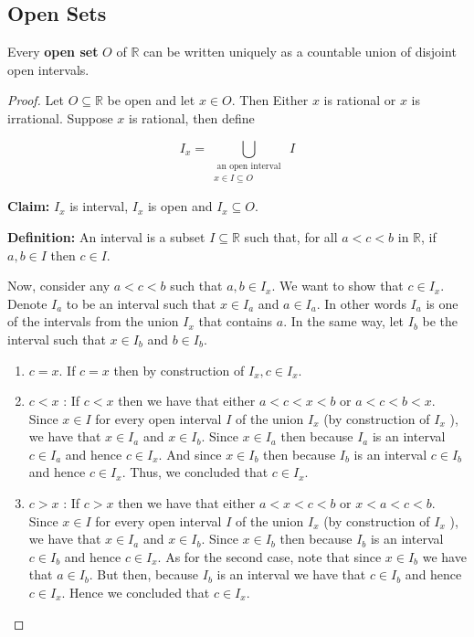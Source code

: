 \documentclass[UTF8,12pt,AutoFakeBold]{ctexbook}
\numberwithin{equation}{section}
\begin{document}
	\subsection{Open Sets}
	
	\begin{theorem}
		Every \textbf{open set} $O$ of $\mathbb{R}$ can be written uniquely as a countable union of disjoint open intervals.
	\end{theorem}
	
	\begin{proof}
		Let $O \subseteq \mathbb{R}$ be open and let $x \in O$. Then Either $x$ is rational or $x$ is irrational.
		Suppose $x$ is rational, then define
		
		$$
		I_x=\bigcup_{\substack{\text { an open interval } \\ x \in I \subseteq O}} I
		$$
		
		\textbf{Claim:} $I_x$ is interval, $I_x$ is open and $I_x \subseteq O$.
		
		\textbf{Definition:} An interval is a subset $I \subseteq \mathbb{R}$ such that, for all $a<c<b$ in $\mathbb{R}$, if $a, b \in I$ then $c \in I$.
		
		Now, consider any $a<c<b$ such that $a, b \in I_x$. We want to show that $c \in I_x$.
		Denote $I_a$ to be an interval such that $x \in I_a$ and $a \in I_a$. In other words $I_a$ is one of the intervals from the union $I_x$ that contains $a$. In the same way, let $I_b$ be the interval such that $x \in I_b$ and $b \in I_b$.
		\begin{enumerate}
			\item $c=x$. If $c=x$ then by construction of $I_x, c \in I_x$.
			\item $c<x$ : If $c<x$ then we have that either $a<c<x<b$ or $a<c<b<x$. Since $x \in I$ for every open interval $I$ of the union $I_x$ (by construction of $I_x$ ), we have that $x \in I_a$ and $x \in I_b$. Since $x \in I_a$ then because $I_a$ is an interval $c \in I_a$ and hence $c \in I_x$. And since $x \in I_b$ then because $I_b$ is an interval $c \in I_b$ and hence $c \in I_x$. Thus, we concluded that $c \in I_x$. 
			\item  $c>x$ : If $c>x$ then we have that either $a<x<c<b$ or $x<a<c<b$. Since $x \in I$ for every open interval $I$ of the union $I_x$ (by construction of $I_x$ ), we have that $x \in I_a$ and $x \in I_b$. Since $x \in I_b$ then because $I_b$ is an interval $c \in I_b$ and hence $c \in I_x$. As for the second case, note that since $x \in I_b$ we have that $a \in I_b$. But then, because $I_b$ is an interval we have that $c \in I_b$ and hence $c \in I_x$. Hence we concluded that $c \in I_x$.
		\end{enumerate}
	

\end{proof}
\end{document}
